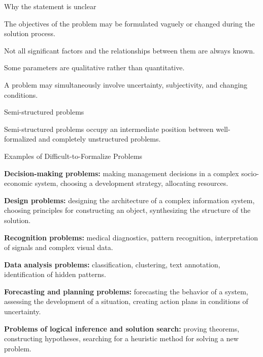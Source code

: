 \begin{frame}{Why the statement is unclear}
	\topline
	\justifying
	
	\begin{textitemize}
		\item The objectives of the problem may be formulated vaguely or changed during the solution process.
		\item Not all significant factors and the relationships between them are always known.
		\item Some parameters are qualitative rather than quantitative.
		\item A problem may simultaneously involve uncertainty, subjectivity, and changing conditions.
	\end{textitemize}
\end{frame}

\begin{frame}{Semi-structured problems}
	\topline
	\justifying
	
	\begin{SCn}
	\end{SCn}
	
	Semi-structured problems occupy an intermediate position between well-formalized and completely unstructured problems.
\end{frame}

\begin{frame}{Examples of Difficult-to-Formalize Problems}
	\topline
	\justifying
	
	\footnotesize
	\vspace{10mm}
	
	\begin{textitemize}
		\item \textbf{Decision-making problems:} making management decisions in a complex socio-economic system, choosing a development strategy, allocating resources.
		\item \textbf{Design problems:} designing the architecture of a complex information system, choosing principles for constructing an object, synthesizing the structure of the solution.
		\item \textbf{Recognition problems:} medical diagnostics, pattern recognition, interpretation of signals and complex visual data.
		\item \textbf{Data analysis problems:} classification, clustering, text annotation, identification of hidden patterns.
		\item \textbf{Forecasting and planning problems:} forecasting the behavior of a system, assessing the development of a situation, creating action plans in conditions of uncertainty.
		\item \textbf{Problems of logical inference and solution search:} proving theorems, constructing hypotheses, searching for a heuristic method for solving a new problem.
	\end{textitemize}
\end{frame}

